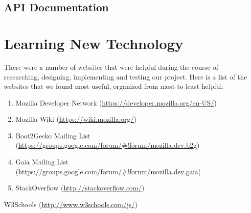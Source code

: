 \documentclass[12pt]{article}
\begin{document}
\subsection{API Documentation}

\pagebreak

\section{Learning New Technology}
There were a number of websites that were helpful during the course of researching, designing, implementing and testing our project. Here is a list of the websites that we found most useful, organized from most to least helpful:
\begin{enumerate}
	\item Mozilla Developer Network (\href{https://developer.mozilla.org/en-US/}{https://developer.mozilla.org/en-US/})
	\item Mozilla Wiki (\href{https://wiki.mozilla.org/}{https://wiki.mozilla.org/})
	\item Boot2Gecko Mailing List (\href{https://groups.google.com/forum/\#!forum/mozilla.dev.b2g}{https://groups.google.com/forum/\#!forum/mozilla.dev.b2g})
	\item Gaia Mailing List (\href{https://groups.google.com/forum/\#!forum/mozilla.dev.gaia}{https://groups.google.com/forum/\#!forum/mozilla.dev.gaia})
	\item StackOverflow (\href{http://stackoverflow.com/}{http://stackoverflow.com/})
\end{enumerate}
	\item W3Schools (\href{http://www.w3schools.com/js/}{http://www.w3schools.com/js/}) 
\end{document}
